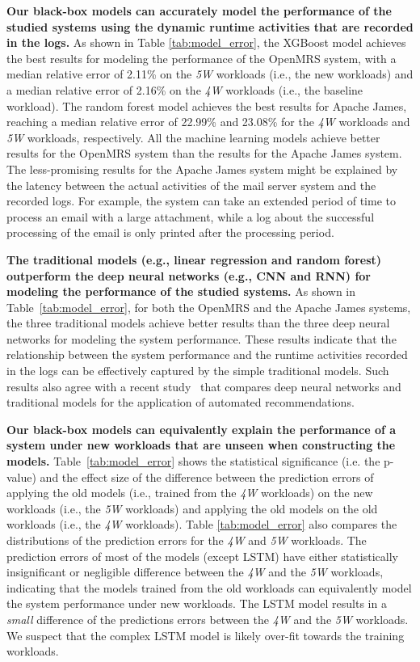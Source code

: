 \noindent\textbf{Our black-box models can accurately model the performance of the studied systems using the dynamic runtime activities that are recorded in the logs.} 
As shown in Table \ref{tab:model_error}, the XGBoost model achieves the best results for modeling the performance of the OpenMRS system, with a median relative error of 2.11\% on the \emph{5W} workloads (i.e., the new workloads) and a median relative error of 2.16\% on the \emph{4W} workloads (i.e., the baseline workload). 
The random forest model achieves the best results for Apache James, reaching a median relative error of 22.99\% and 23.08\% for the \emph{4W} workloads and \emph{5W} workloads, respectively. 
All the machine learning models achieve better results for the OpenMRS system than the results for the Apache James system.
The less-promising results for the Apache James system might be explained by the latency between the actual activities of the mail server system and the recorded logs. For example, the system can take an extended period of time to process an email with a large attachment, while a log about the successful processing of the email is only printed after the processing period.

\noindent\textbf{The traditional models (e.g., linear regression and random forest) outperform the deep neural networks (e.g., CNN and RNN) for modeling the performance of the studied systems.}
As shown in Table~\ref{tab:model_error}, for both the OpenMRS and the Apache James systems, the three traditional models achieve better results than the three deep neural networks for modeling the system performance.
These results indicate that the relationship between the system performance and the runtime activities recorded in the logs can be effectively captured by the simple traditional models.
Such results also agree with a recent study~\citep{DacremaArxiv2019} that compares deep neural networks and traditional models for the application of automated recommendations.


\noindent\textbf{Our black-box models can equivalently explain the performance of a system under new workloads that are unseen when constructing the models.}
Table~\ref{tab:model_error} shows the statistical significance (i.e. the p-value) and the effect size of the difference between the prediction errors of applying the old models (i.e., trained from the \emph{4W} workloads) on the new workloads (i.e., the \emph{5W} workloads) and applying the old models on the old workloads (i.e., the \emph{4W} workloads). 
Table \ref{tab:model_error} also compares the distributions of the prediction errors for the \emph{4W} and \emph{5W} workloads.
The prediction errors of most of the models (except LSTM) have either statistically insignificant or negligible difference between the \emph{4W} and the \emph{5W} workloads, indicating that the models trained from the old workloads can equivalently model the system performance under new workloads.
The LSTM model results in a \emph{small} difference of the predictions errors between the \emph{4W} and the \emph{5W} workloads. We suspect that the complex LSTM model is likely over-fit towards the training workloads.

